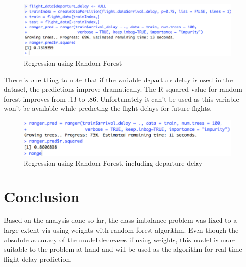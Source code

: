 \begin{figure}[H]
    \centering
    \includegraphics[width=\textwidth]{Figures/regression_rf_no_departure.png}
    \caption{Regression using Random Forest}
    \label{fig:regression_rf_no_departure}
\end{figure}

There is one thing to note that if the variable departure delay is used in the dataset, the predictions improve dramatically. The R-squared value for random forest improves from .13 to .86. Unfortunately it can't be used as this variable won't be available while predicting the flight delays for future flights.

\begin{figure}[H]
    \centering
    \includegraphics[width=\textwidth]{Figures/regression_rf.png}
    \caption{Regression using Random Forest, including departure delay}
    \label{fig:regression_rf}
\end{figure}


\section{Conclusion}
Based on the analysis done so far, the class imbalance problem was fixed to a large extent via using weights with random forest algorithm. Even though the absolute accuracy of the model decreases if using weights, this model is more suitable to the problem at hand and will be used as the algorithm for real-time flight delay prediction.